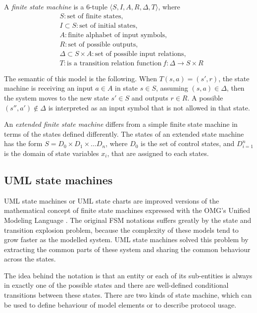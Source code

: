 A \textit{finite state machine} is a 6-tuple $\langle S, I, A, R, \Delta, T\rangle$, where
\begin{align*}
& S: \text{set of finite states},\\
& I \subset S: \text{set of initial states},\\
& A: \text{finite alphabet of input symbols},\\
& R: \text{set of possible outputs},\\
& \Delta \subset S \times A: \text{set of possible input relations},\\
& T: \text{is a transition relation function}\ f: \Delta \rightarrow S \times R
\end{align*}

The semantic of this model is the following. When $T(s, a) = (s', r)$, the state machine is receiving an input $a \in A$ in state $s \in S$, assuming $(s,a) \in \Delta$, then the system moves to the new state $s' \in S$ and outputs $r \in R$. A possible $(s'', a') \notin \Delta$ is interpreted as an input symbol that is not allowed in that state.

An \textit{extended finite state machine} differs from a simple finite state machine in terms of the states defined differently. The states of an extended state machine has the form $S = D_0 \times D_1 \times \dots D_n$, where $D_0$ is the set of control states, and $D_{i=1}^n$ is the domain of state variables $x_i$, that are assigned to each states.


\subsection{UML state machines}
\label{sub:umlstatemachine}

UML state machines or UML state charts are improved versions of the mathematical concept of finite state machines expressed with the OMG's Unified Modeling Language \cite{omguml}. The original FSM notations suffers greatly by the state and transition explosion problem, because the complexity of these models tend to grow faster as the modelled system. UML state machines solved this problem by extracting the common parts of these system and sharing the common behaviour across the states.

The idea behind the notation is that an entity or each of its sub-entities is always in exactly one of the possible states and there are well-defined conditional transitions between these states. There are two kinds of state machine, which can be used to define behaviour of model elements or to describe protocol usage.

